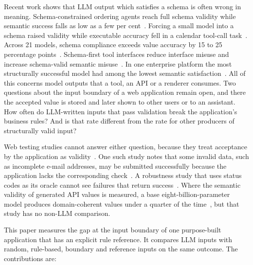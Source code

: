 \documentclass[conference]{IEEEtran}
\begin{document}
Recent work shows that LLM output which satisfies a schema is often wrong in meaning.
Schema-constrained ordering agents reach full schema validity while semantic success falls as low as a
few per cent~\cite{li2026orderbench}. Forcing a small model into a schema raised validity while
executable accuracy fell in a calendar tool-call task~\cite{ray2026constrainttax}. Across 21 models,
schema compliance exceeds value accuracy by 15 to 25 percentage points~\cite{singh2026sob}. Schema-first
tool interfaces reduce interface misuse and increase schema-valid semantic
misuse~\cite{sigdel2026schemafirst}. In one enterprise platform the most structurally successful model
had among the lowest semantic satisfaction~\cite{wrenn2026enterprise}. All of this concerns model
outputs that a tool, an API or a renderer consumes. Two questions about the input boundary of a web
application remain open, and there the accepted value is stored and later shown to other users or to an
assistant. How often do LLM-written inputs that pass validation break the application's business rules?
And is that rate different from the rate for other producers of structurally valid input?

Web testing studies cannot answer either question, because they treat acceptance by the application as
validity~\cite{li2026webformtest,alian2024formnexus}. One such study notes that some invalid data, such
as incomplete e-mail addresses, may be submitted successfully because the application lacks the
corresponding check~\cite{li2026webformtest}. A robustness study that uses status codes as its oracle
cannot see failures that return success~\cite{tigulla2026robustness}. Where the semantic validity of
generated API values is measured, a base eight-billion-parameter model produces domain-coherent values
under a quarter of the time~\cite{kim2025llamaresttest}, but that study has no non-LLM comparison.

This paper measures the gap at the input boundary of one purpose-built application that has an explicit
rule reference. It compares LLM inputs with random, rule-based, boundary and reference inputs on the
same outcome. The contributions are:
\end{document}
